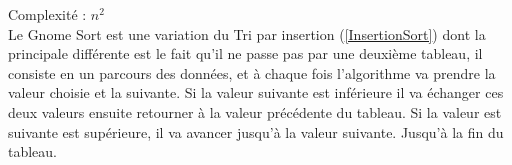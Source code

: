 \label{GnomeSort}
\footnotesize 
\noindent
Complexité :  $ n^2$
\\
\normalsize
Le Gnome Sort est une variation du Tri par insertion (\ref{InsertionSort}) dont la principale différente est le fait qu'il ne passe pas par une deuxième tableau, il consiste en un parcours des données, et à chaque fois l'algorithme va prendre la valeur choisie et la suivante. Si la valeur suivante est inférieure il va échanger ces deux valeurs ensuite retourner à la valeur précédente du tableau. Si la valeur est suivante est supérieure, il va avancer jusqu'à la valeur suivante. Jusqu'à la fin du tableau.